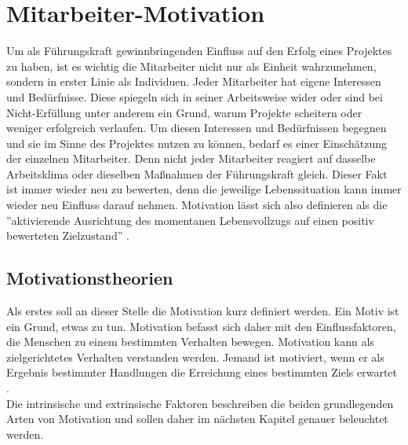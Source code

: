 \documentclass[12pt,a4paper]{scrreprt}
\begin{document}
\chapter{Mitarbeiter-Motivation}
\thispagestyle{fancy}
Um als Führungskraft gewinnbringenden Einfluss auf den Erfolg eines Projektes zu haben, ist es wichtig die Mitarbeiter nicht nur als Einheit wahrzunehmen, sondern in erster Linie als Individuen. Jeder Mitarbeiter hat eigene Interessen und Bedürfnisse. Diese spiegeln sich in seiner Arbeitsweise wider oder sind bei Nicht-Erfüllung unter anderem ein Grund, warum Projekte scheitern oder weniger erfolgreich verlaufen. Um diesen Interessen und Bedürfnissen begegnen und sie im Sinne des Projektes nutzen zu können, bedarf es einer Einschätzung der einzelnen Mitarbeiter. Denn nicht jeder Mitarbeiter reagiert auf dasselbe Arbeitsklima oder dieselben Maßnahmen der Führungskraft gleich. Dieser Fakt ist immer wieder neu zu bewerten, denn die jeweilige Lebenssituation kann immer wieder neu Einfluss darauf nehmen. Motivation lässt sich also definieren als die ''aktivierende Ausrichtung des momentanen Lebensvollzugs auf einen positiv bewerteten Zielzustand'' \cite[S. 17]{Rheinberg2002}.

\section{Motivationstheorien}
Als erstes soll an dieser Stelle die Motivation kurz definiert werden. Ein Motiv ist ein Grund, etwas zu tun. Motivation befasst sich daher mit den Einflussfaktoren, die Menschen zu einem bestimmten Verhalten bewegen. Motivation kann als zielgerichtetes Verhalten verstanden werden. Jemand ist motiviert, wenn er als Ergebnis bestimmter Handlungen die Erreichung eines bestimmten Ziels erwartet \cite{Armstrong1999}.\\
Die intrinsische und extrinsische Faktoren beschreiben die beiden grundlegenden Arten von Motivation und sollen daher im nächsten Kapitel genauer beleuchtet werden.
\end{document}
